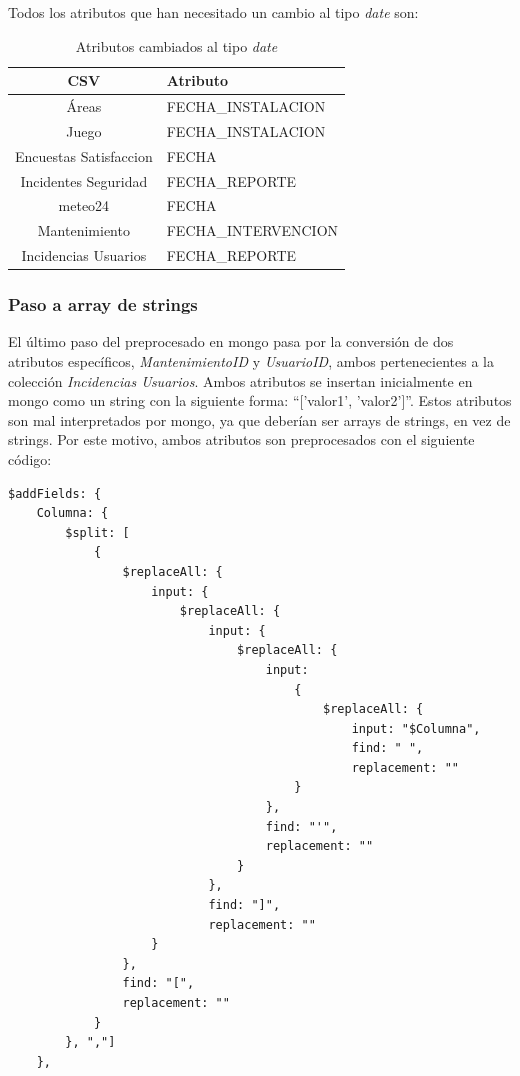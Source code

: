 \documentclass[]{article}
\begin{document}
Todos los atributos que han necesitado un cambio al tipo \textit{date} son:

\begin{table}[H]
    \centering
    \begin{tabular}{| c | l | }
        \hline
        CSV & Atributo \\ \hline
        Áreas & FECHA\_INSTALACION \\
        Juego & FECHA\_INSTALACION \\ 
        Encuestas Satisfaccion & FECHA\\ 
        Incidentes Seguridad & FECHA\_REPORTE \\ 
        meteo24 & FECHA\\ 
        Mantenimiento & FECHA\_INTERVENCION\\ 
        Incidencias Usuarios & FECHA\_REPORTE\\ 
        \hline
    \end{tabular}
    \caption{Atributos cambiados al tipo \textit{date}}
\end{table}

\subsubsection{Paso a array de strings}
El último paso del preprocesado en mongo pasa por la conversión de dos atributos específicos, \textit{MantenimientoID} y \textit{UsuarioID}, ambos pertenecientes a la colección \textit{Incidencias Usuarios}. Ambos atributos se insertan inicialmente en mongo como un string con la siguiente forma: ``['valor1', 'valor2']''. Estos atributos son mal interpretados por mongo, ya que deberían ser arrays de strings, en vez de strings. Por este motivo, ambos atributos son preprocesados con el siguiente código:

\begin{lstlisting}
$addFields: {
    Columna: {
        $split: [
            {
                $replaceAll: {
                    input: {
                        $replaceAll: {
                            input: {
                                $replaceAll: {
                                    input:
                                        {
                                            $replaceAll: {
                                                input: "$Columna",
                                                find: " ",
                                                replacement: ""
                                        }
                                    },
                                    find: "'",
                                    replacement: ""
                                }
                            },
                            find: "]",
                            replacement: ""
                    }
                },
                find: "[",
                replacement: ""
            }
        }, ","]
    },
\end{lstlisting}
\end{document}
